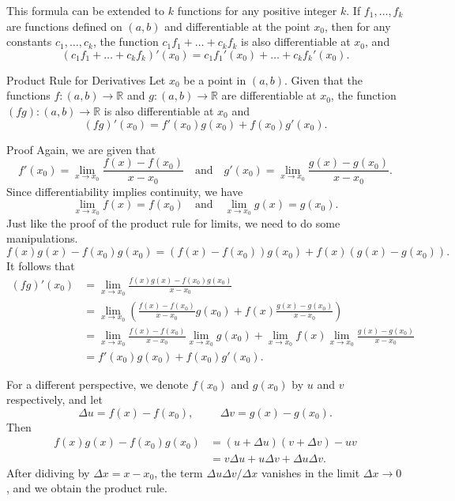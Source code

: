 This formula can be extended to $k$ functions for any positive integer $k$. If $f_1,  \ldots, f_k$ are functions defined on $(a,b)$ and differentiable at the point $x_0$, then for any constants $c_1, \ldots, c_k$, the function $c_1 f_1+\ldots+c_k f_k$ is also differentiable at $x_0$, and
\[(c_1 f_1+\ldots+c_k f_k)'(x_0)=c_1f_1'(x_0)+\ldots+c_kf_k'(x_0).\]

\begin{proposition}[label=23021306]{Product  Rule for Derivatives}
Let $x_0$ be a point in $(a, b)$. Given that the functions $f:(a,b)\to \mathbb{R}$ and $g:(a,b)\to \mathbb{R}$ are differentiable at $x_0$,   the function $(fg) :(a,b)\rightarrow\mathbb{R}$ is also differentiable at $x_0$ and
\[(fg)'(x_0)=  f'(x_0)g(x_0)+f(x_0) g'(x_0).\]

\end{proposition}

\begin{myproof}{Proof}
Again, we are given that
\[f'(x_0)=\lim_{x\to x_0}\frac{f(x)-f(x_0)}{x-x_0}\quad\text{and}\quad g'(x_0)=\lim_{x\to x_0}\frac{g(x)-g(x_0)}{x-x_0}.\] Since differentiability implies continuity, we have
\[\lim_{x\to x_0}f(x)=f(x_0) \quad\text{and}\quad \lim_{x\to x_0}g(x)=g(x_0).\]
Just like the proof of the product rule for limits, we need to do some manipulations.
\[f(x)g(x)-f(x_0)g(x_0)=(f(x)-f(x_0))g(x_0)+f(x)(g(x)-g(x_0)).\]
It follows that
\begin{align*}
(fg)'(x_0)&=\lim_{x\to x_0}\frac{f(x)g(x)-f(x_0)g(x_0)}{x-x_0}\\
&=\lim_{x\to x_0}\left(\frac{f(x)-f(x_0)}{x-x_0}g(x_0)+f(x)\frac{g(x)-g(x_0)}{x-x_0}\right)\\
&=\lim_{x\to x_0} \frac{f(x)-f(x_0)}{x-x_0}\lim_{x\to x_0} g(x_0)+\lim_{x\to x_0} f(x)\lim_{x\to x_0}\frac{g(x)-g(x_0)}{x-x_0}\\
&=f'(x_0)g(x_0)+f(x_0)g'(x_0).
\end{align*}
\end{myproof}
For a different perspective, we denote $f(x_0)$ and $g(x_0)$ by $u$ and $v$ respectively, and let
\[\Delta u =f(x)-f(x_0),\hspace{1cm} \Delta v=g(x)-g(x_0).\]
Then
\begin{align*}
f(x)g(x)-f(x_0)g(x_0)&=(u+\Delta u)(v+\Delta v)-uv\\
&=v\Delta u+u\Delta v +\Delta u\Delta v.
\end{align*}After didiving by $\Delta x=x-x_0$, the term $\Delta u\Delta v/\Delta x$ vanishes in the limit $\Delta x\to 0$, and we obtain the product rule.

